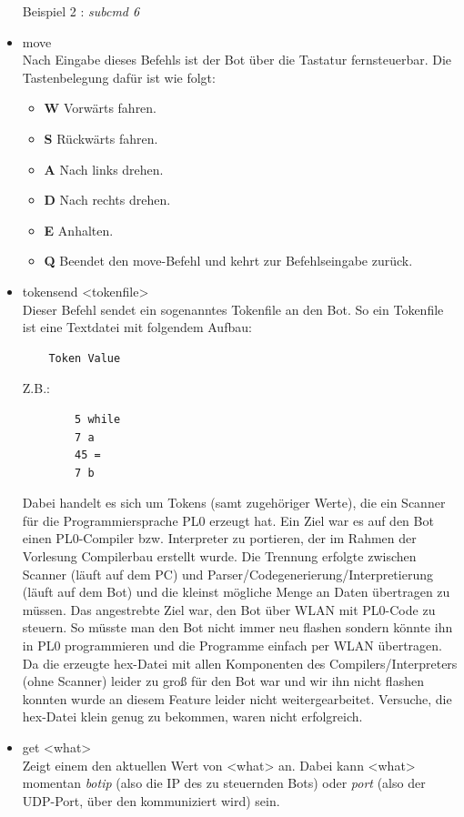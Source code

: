 \begin{itemize}
    Beispiel 2 : \textit{subcmd 6}
    \item move\\
    Nach Eingabe dieses Befehls ist der Bot über die Tastatur fernsteuerbar. Die Tastenbelegung dafür ist wie folgt:
    \begin{itemize}
        \item \textbf{W} Vorwärts fahren.
        \item \textbf{S} Rückwärts fahren.
        \item \textbf{A} Nach links drehen.
        \item \textbf{D} Nach rechts drehen.
        \item \textbf{E} Anhalten.
        \item \textbf{Q} Beendet den move-Befehl und kehrt zur Befehlseingabe zurück.
    \end{itemize}
    \item tokensend <tokenfile>\\
    Dieser Befehl sendet ein sogenanntes Tokenfile an den Bot. So ein Tokenfile ist eine Textdatei mit folgendem Aufbau:
    \begin{verbatim}
    Token Value
    \end{verbatim}
    Z.B.:
    \begin{verbatim}
        5 while
        7 a
        45 =
        7 b
    \end{verbatim}
    Dabei handelt es sich um Tokens (samt zugehöriger Werte), die ein Scanner für die Programmiersprache PL0 erzeugt hat. Ein Ziel war es auf den Bot einen PL0-Compiler bzw. Interpreter zu portieren, der im Rahmen der Vorlesung Compilerbau erstellt wurde. Die Trennung erfolgte zwischen Scanner (läuft auf dem PC) und Parser/Codegenerierung/Interpretierung (läuft auf dem Bot) und die kleinst mögliche Menge an Daten übertragen zu müssen. Das angestrebte Ziel war, den Bot über WLAN mit PL0-Code zu steuern. So müsste man den Bot nicht immer neu flashen sondern könnte ihn in PL0 programmieren und die Programme einfach per WLAN übertragen.
    Da die erzeugte hex-Datei mit allen Komponenten des Compilers/Interpreters (ohne Scanner) leider zu groß für den Bot war und wir ihn nicht flashen konnten wurde an diesem Feature leider nicht weitergearbeitet. Versuche, die hex-Datei klein genug zu bekommen, waren nicht erfolgreich.
    \item get <what>\\
    Zeigt einem den aktuellen Wert von <what> an. Dabei kann <what> momentan \textit{botip} (also die IP des zu steuernden Bots) oder \textit{port} (also der UDP-Port, über den kommuniziert wird) sein.
    

\end{itemize}
